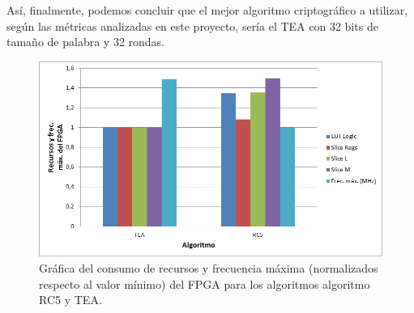 Así, finalmente, podemos concluir que el mejor algoritmo criptográfico a utilizar, según las métricas analizadas en este proyecto, sería el TEA con 32 bits de tamaño de palabra y 32 rondas.
\begin{figure}
	\centering
	\includegraphics[width=1\textwidth]{./images/figNormalizadoComparativo}
	\caption{Gráfica del consumo de recursos y frecuencia máxima (normalizados respecto al valor mínimo) del FPGA para los algoritmos algoritmo RC5 y TEA.}
	\label{figNormalizadoComparativa}
\end{figure}
